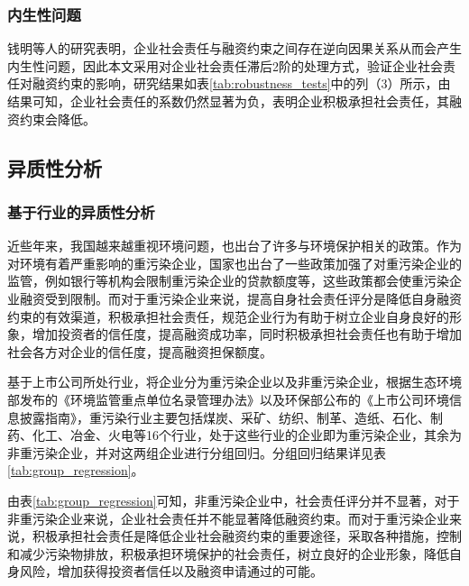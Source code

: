 \documentclass[12pt,a4paper]{article}
\begin{document}
\subsubsection{内生性问题}
钱明等人的研究表明，企业社会责任与融资约束之间存在逆向因果关系从而会产生内生性问题，因此本文采用对企业社会责任滞后2阶的处理方式，验证企业社会责任对融资约束的影响，研究结果如表\ref{tab:robustness_tests}中的列（3）所示，由结果可知，企业社会责任的系数仍然显著为负，表明企业积极承担社会责任，其融资约束会降低。

\subsection{异质性分析}

\subsubsection{基于行业的异质性分析}

近些年来，我国越来越重视环境问题，也出台了许多与环境保护相关的政策。作为对环境有着严重影响的重污染企业，国家也出台了一些政策加强了对重污染企业的监管，例如银行等机构会限制重污染企业的贷款额度等，这些政策都会使重污染企业融资受到限制。而对于重污染企业来说，提高自身社会责任评分是降低自身融资约束的有效渠道，积极承担社会责任，规范企业行为有助于树立企业自身良好的形象，增加投资者的信任度，提高融资成功率，同时积极承担社会责任也有助于增加社会各方对企业的信任度，提高融资担保额度。

基于上市公司所处行业，将企业分为重污染企业以及非重污染企业，根据生态环境部发布的《环境监管重点单位名录管理办法》以及环保部公布的《上市公司环境信息披露指南》，重污染行业主要包括煤炭、采矿、纺织、制革、造纸、石化、制药、化工、冶金、火电等16个行业，处于这些行业的企业即为重污染企业，其余为非重污染企业，并对这两组企业进行分组回归。分组回归结果详见表\ref{tab:group_regression}。

由表\ref{tab:group_regression}可知，非重污染企业中，社会责任评分并不显著，对于非重污染企业来说，企业社会责任并不能显著降低融资约束。而对于重污染企业来说，积极承担社会责任是降低企业社会融资约束的重要途径，采取各种措施，控制和减少污染物排放，积极承担环境保护的社会责任，树立良好的企业形象，降低自身风险，增加获得投资者信任以及融资申请通过的可能。
\end{document}
